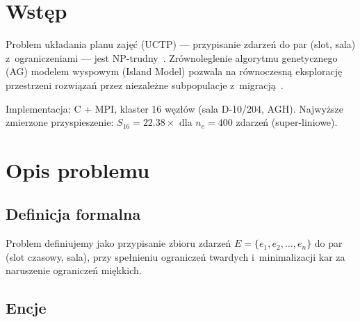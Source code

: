 \documentclass{common/sprawozdanie-agh}
\begin{document}
\stronatytulowa{}
\tableofcontents
\newpage

\section{Wstęp}

Problem układania planu zajęć (UCTP) --- przypisanie zdarzeń do par (slot, sala) z~ograniczeniami --- jest NP-trudny~\cite{banczyk}. Zrównoleglenie algorytmu genetycznego (AG) modelem wyspowym (Island Model) pozwala na równoczesną eksplorację przestrzeni rozwiązań przez niezależne subpopulacje z~migracją~\cite{faris}.

Implementacja: C + MPI, klaster 16 węzłów (sala D-10/204, AGH). Najwyższe zmierzone przyspieszenie: $S_{16}=22.38\times$ dla $n_e=400$ zdarzeń (super-liniowe).

\section{Opis problemu}

\subsection{Definicja formalna}

Problem definiujemy jako przypisanie zbioru zdarzeń $E = \{e_1, e_2, \ldots, e_n\}$ do par (slot czasowy, sala), przy spełnieniu ograniczeń twardych i~minimalizacji kar za naruszenie ograniczeń miękkich.

\subsection{Encje}
\end{document}
